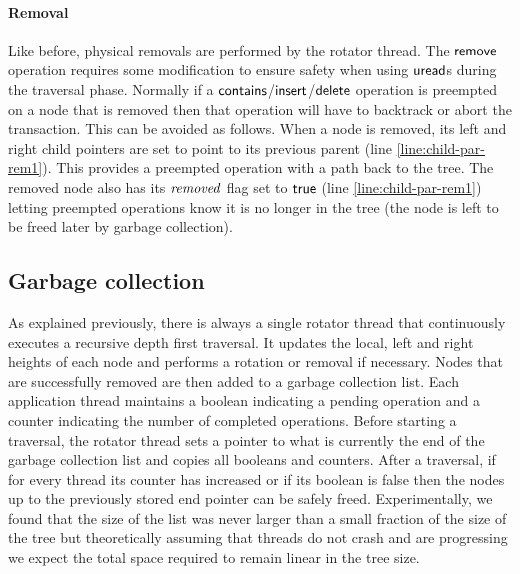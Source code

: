 \paragraph{Removal}
Like before, physical removals are performed by the rotator thread.
The $\act{remove}$ operation requires some modification to ensure safety when using $\act{uread}$s during the traversal phase.
Normally if a $\act{contains}$/$\act{insert}$/$\act{delete}$ operation is preempted on a node that is removed then that operation will have to backtrack or abort the transaction.
This can be avoided as follows.
When a node is removed, its left and right child pointers are set to point to its previous parent (line \ref{line:child-par-rem1}).%
This provides a preempted operation with a path back to the tree.
The removed node also has its $\ms{removed}$ flag set to $\lit{true}$ (line \ref{line:child-par-rem1}) 
letting preempted operations know it is no longer in the tree (the node is left to be freed later by garbage collection).

\subsection{Garbage collection}\label{ssec:gc}

As explained previously, there is always a single rotator thread that continuously executes a recursive depth 
first traversal. 
It updates the local, left and right heights of each node and performs a rotation
or removal
if necessary. Nodes that are successfully removed are then added to a
garbage collection list.
Each 
application thread maintains a boolean indicating a pending operation and a counter indicating the number of 
completed operations. Before starting a traversal, the rotator thread sets a pointer to what is currently the end of 
the garbage collection list and copies all booleans and counters. After a traversal, if for every thread its counter 
has increased or if its boolean is false then the nodes up to the previously stored end pointer can be safely 
freed. Experimentally, we found that the size of the list was never larger than a small fraction of the size of the 
tree but theoretically assuming that threads do not crash and are progressing
we expect the total space required to remain linear in the tree size.



